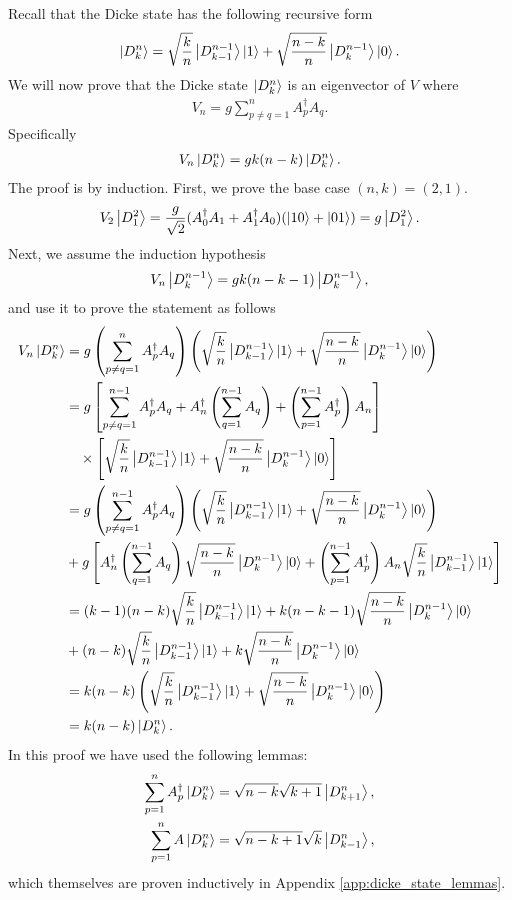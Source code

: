 \documentclass[10pt]{article}
\begin{document}
Recall that the Dicke state \cite{ref:dicke} has the following recursive form
\begin{align}
\label{dicke_def}
\ket{D^n_k}
=
\sqrt{\frac{k}{n}}\ket{D^{n-1}_{k-1}}\ket{1}+\sqrt{\frac{n-k}{n}}\ket{D^{n-1}_k}\ket{0}
.\end{align}
We will now prove that the Dicke state $\ket{D^n_k}$ is an eigenvector of $V$ where
\begin{align}
V_n=g\sum_{p\neq q=1}^nA^\dagger_pA_q
.\end{align}
Specifically
\begin{align}
V_n\ket{D^n_k} 
=
gk(n-k)\ket{D^n_k}
.\end{align}
The proof is by induction. First, we prove the base case $(n,k)=(2,1)$.
\begin{align}
V_2\ket{D^2_1}
=
\frac{g}{\sqrt{2}}(A^\dagger_0A_1+A^\dagger_1A_0)(\ket{10}+\ket{01})
=
g\ket{D^2_1}
.\end{align}
Next, we assume the induction hypothesis
\begin{align}
V_n\ket{D^{n-1}_k} 
=
gk(n-k-1)\ket{D^{n-1}_k}
,\end{align}
and use it to prove the statement as follows
\begin{align}
V_n\ket{D^n_k}
&=
g
\left(\sum_{p\neq q=1}^nA^\dagger_pA_q\right)
\left(\sqrt{\frac{k}{n}}\ket{D^{n-1}_{k-1}}\ket{1}+\sqrt{\frac{n-k}{n}}\ket{D^{n-1}_k}\ket{0}\right)
\\
&=
g
\left[
\sum_{p\neq q=1}^{n-1}A^\dagger_pA_q
+
A^\dagger_n\left(\sum_{q=1}^{n-1}A_q\right)
+
\left(\sum_{p=1}^{n-1}A^\dagger_p\right)A_n
\right]
\nonumber
\\
& \hspace{3.5mm} \times
\left[\sqrt{\frac{k}{n}}\ket{D^{n-1}_{k-1}}\ket{1}+\sqrt{\frac{n-k}{n}}\ket{D^{n-1}_k}\ket{0}\right]
\\
&=
g
\left(\sum_{p\neq q=1}^{n-1}A^\dagger_pA_q\right)
\left(\sqrt{\frac{k}{n}}\ket{D^{n-1}_{k-1}}\ket{1}+\sqrt{\frac{n-k}{n}}\ket{D^{n-1}_k}\ket{0}\right)
\nonumber
\\
&+
g
\left[
A^\dagger_n\left(\sum_{q=1}^{n-1}A_q\right)
\sqrt{\frac{n-k}{n}}\ket{D^{n-1}_k}\ket{0}
+
\left(\sum_{p=1}^{n-1}A^\dagger_p\right)A_n
\sqrt{\frac{k}{n}}\ket{D^{n-1}_{k-1}}\ket{1}
\right]
\\
&=
(k-1)(n-k)\sqrt{\frac{k}{n}}\ket{D^{n-1}_{k-1}}\ket{1}
+
k(n-k-1)\sqrt{\frac{n-k}{n}}\ket{D^{n-1}_k}\ket{0}
\nonumber
\\
&+
(n-k)\sqrt{\frac{k}{n}}\ket{D^{n-1}_{k-1}}\ket{1}
+
k\sqrt{\frac{n-k}{n}}\ket{D^{n-1}_k}\ket{0}
\\
&=
k(n-k)\left(\sqrt{\frac{k}{n}}\ket{D^{n-1}_{k-1}}\ket{1}+\sqrt{\frac{n-k}{n}}\ket{D^{n-1}_k}\ket{0}\right)
\\
&=
k(n-k)\ket{D^n_k}
.\end{align}
In this proof we have used the following lemmas:
\begin{align}
\sum_{p=1}^nA^\dagger_p\ket{D^n_k}
&=\sqrt{n-k}\sqrt{k+1}\ket{D^n_{k+1}},
\\
\sum_{p=1}^nA\ket{D^n_k}
&=\sqrt{n-k+1}\sqrt{k}\ket{D^n_{k-1}},
\end{align}
which themselves are proven inductively in Appendix \ref{app:dicke_state_lemmas}. 
\end{document}
